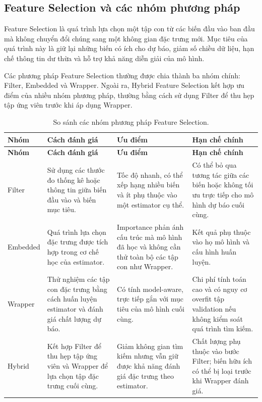 \subsection{Feature Selection và các nhóm phương pháp}
\label{subsec:feature-selection-theory}

Feature Selection là quá trình lựa chọn một tập con từ các biến đầu
vào ban đầu mà không chuyển đổi chúng sang một không gian đặc trưng
mới. Mục tiêu của quá trình này là giữ lại những biến có ích cho dự
báo, giảm số chiều dữ liệu, hạn chế thông tin dư thừa và hỗ trợ khả
năng diễn giải của mô hình.

Các phương pháp Feature Selection thường được chia thành ba nhóm
chính: Filter, Embedded và Wrapper. Ngoài ra, Hybrid Feature Selection
kết hợp ưu điểm của nhiều nhóm phương pháp, thường bằng cách sử dụng
Filter để thu hẹp tập ứng viên trước khi áp dụng Wrapper.

\small
\begin{longtable}{
    @{}
    >{\raggedright\arraybackslash}p{}
    >{\raggedright\arraybackslash}p{}
    >{\raggedright\arraybackslash}p{}
    >{\raggedright\arraybackslash}p{}
    @{}
}
\caption{So sánh các nhóm phương pháp Feature Selection.}
\label{tab:feature-selection-groups}\\

\toprule
\textbf{Nhóm}
&
\textbf{Cách đánh giá}
&
\textbf{Ưu điểm}
&
\textbf{Hạn chế chính}
\\
\midrule
\endfirsthead

\toprule
\textbf{Nhóm}
&
\textbf{Cách đánh giá}
&
\textbf{Ưu điểm}
&
\textbf{Hạn chế chính}
\\
\midrule
\endhead

\bottomrule
\endlastfoot

Filter
&
Sử dụng các thước đo thống kê hoặc thông tin giữa biến đầu vào
và biến mục tiêu.
&
Tốc độ nhanh, có thể xếp hạng nhiều biến và ít phụ thuộc vào
một estimator cụ thể.
&
Có thể bỏ qua tương tác giữa các biến hoặc không tối ưu trực tiếp
cho mô hình dự báo cuối cùng.
\\

Embedded
&
Quá trình lựa chọn đặc trưng được tích hợp trong cơ chế học
của estimator.
&
Importance phản ánh cấu trúc mà mô hình đã học và không cần
thử toàn bộ các tập con như Wrapper.
&
Kết quả phụ thuộc vào họ mô hình và cấu hình huấn luyện.
\\

Wrapper
&
Thử nghiệm các tập con đặc trưng bằng cách huấn luyện estimator
và đánh giá chất lượng dự báo.
&
Có tính model-aware, trực tiếp gắn với mục tiêu của mô hình
cuối cùng.
&
Chi phí tính toán cao và có nguy cơ overfit tập validation
nếu không kiểm soát quá trình tìm kiếm.
\\

Hybrid
&
Kết hợp Filter để thu hẹp tập ứng viên và Wrapper để lựa chọn
tập đặc trưng cuối cùng.
&
Giảm không gian tìm kiếm nhưng vẫn giữ được khả năng đánh giá
đặc trưng theo estimator.
&
Chất lượng phụ thuộc vào bước Filter; biến hữu ích có thể bị
loại trước khi Wrapper đánh giá.
\\

\end{longtable}
\normalsize

